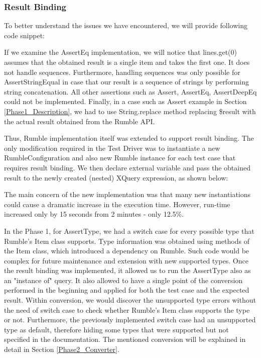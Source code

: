 \subsubsection{Result Binding}
To better understand the issues we have encountered, we will provide following code snippet:



If we examine the AssertEq implementation, we will notice that lines.get(0) assumes that the obtained result is a single item and takes the first one. It does not handle sequences. Furthermore, handling sequences was only possible for AssertStringEqual in case that our result is a sequence of strings by performing string concatenation. All other assertions such as Assert, AssertEq, AssertDeepEq could not be implemented. Finally, in a case such as Assert example in Section \ref{Phase1_Description}, we had to use String.replace method replacing \$result with the actual result obtained from the Rumble API. 

Thus, Rumble implementation itself was extended to support result binding. The only modification required in the Test Driver was to instantiate a new RumbleConfiguration and also new Rumble instance for each test case that requires result binding. We then declare external variable and pass the obtained result to the newly created (nested) XQuery expression, as shown below:



The main concern of the new implementation was that many new instantiations could cause a dramatic increase in the execution time. However, run-time increased only by 15 seconds from 2 minutes - only 12.5\%.

In the Phase 1, for AssertType, we had a switch case for every possible type that Rumble's Item class supports. Type information was obtained using methods of the Item class, which introduced a dependency on Rumble. Such code would be complex for future maintenance and extension with new supported types. Once the result binding was implemented, it allowed us to run the AssertType also as an "instance of" query. It also allowed to have a single point of the conversion performed in the beginning and applied for both the test case and the expected result. Within conversion, we would discover the unsupported type errors without the need of switch case to check whether Rumble's Item class supports the type or not. Furthermore, the previously implemented switch case had an unsupported type as default, therefore hiding some types that were supported but not specified in the documentation. The mentioned conversion will be explained in detail in Section \ref{Phase2_Converter}. 

